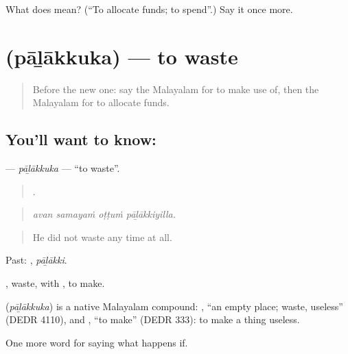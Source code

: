 \begin{tcolorbox}[breakable,colback=teal!4,colframe=teal!35!black,title={Before you move on}]
What does  mean? (\textquotedblleft{}To allocate funds; to spend\textquotedblright{}.) Say it once more.
\end{tcolorbox}
\section[\texorpdfstring{\ml{പാഴാക്കുക} (pāḻākkuka)}{പാഴാക്കുക (pāḻākkuka)}]{ (pāḻākkuka) — to waste}

\label{lesson:ML-C458-palakkuka}



\begin{quote}
Before the new one: say the Malayalam for to make use of, then the Malayalam for to allocate funds.
\end{quote}

\subsection*{You'll want to know: }
\textbf{} — \emph{pāḻākkuka} — \textquotedblleft{}to waste\textquotedblright{}.

\begin{quote}
   .
\end{quote}

\begin{quote}
\emph{avan samayaṁ oṭṭuṁ pāḻākkiyilla.}
\end{quote}

\begin{quote}
He did not waste any time at all.
\end{quote}

Past: , \emph{pāḻākki}.

, waste, with , to make.

\begin{cousinweb}
\textbf{} (\emph{pāḻākkuka}) is a native Malayalam compound: , \textquotedblleft{}an empty place; waste, useless\textquotedblright{} (DEDR 4110), and , \textquotedblleft{}to make\textquotedblright{} (DEDR 333): to make a thing useless.
\end{cousinweb}

\begin{grammarlens}[title={What you've built}]
One more word for saying what happens if.
\end{grammarlens}

